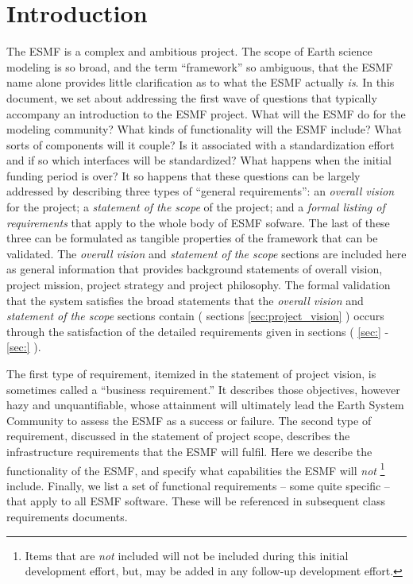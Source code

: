 \section{Introduction}
The ESMF is a complex and ambitious 
project.   The scope of Earth science modeling is so broad, and the 
term ``framework'' so ambiguous, that the ESMF name alone provides 
little clarification as to what the ESMF actually {\it is}.  In 
this document, we set about addressing the first wave of questions that 
typically accompany an introduction to the ESMF project.  What will the 
ESMF do for the modeling community?  What kinds of functionality will the ESMF 
include?  What sorts of components will it couple?  Is it associated with 
a standardization effort and if so which interfaces will be 
standardized?  What happens when the initial funding period is over?  
It so happens that these questions can be largely addressed by
describing three types of ``general requirements'': an {\it overall vision}
for the project; a {\it statement of the scope} of the project; and a {\it formal listing of requirements} that apply to the whole body of ESMF sofware.
The last of these three can be formulated as tangible properties of the 
framework that can be validated. The {\it overall vision} and {\it statement of 
the scope} sections are included here as general information that provides
background statements of overall vision, project mission, project strategy
and project philosophy. The formal validation that the system satisfies the
broad statements that the {\it overall vision} and {\it statement of the scope} 
sections contain ( sections \ref{sec:project_vision} ) occurs through the satisfaction
of the detailed requirements given in sections ( \ref{sec:} - \ref{sec:} ).


The first type of requirement, itemized in the statement of project
vision, is sometimes called a ``business requirement.'' \cite{wiegers}
It describes those objectives, however hazy and unquantifiable, whose
attainment will ultimately lead the Earth System Community to assess
the ESMF as a success or failure.  The second type of requirement,
discussed in the statement of project scope, describes the
infrastructure requirements that the ESMF will fulfil.  Here we
describe the functionality of the ESMF, and specify what capabilities
the ESMF will {\it not} 
\footnote{ Items that are {\it not}
included will not be included during this initial development
effort, but, may be added in any follow-up
development effort.}
include.
Finally, we list a set of functional
requirements -- some quite specific -- that apply to all ESMF
software.  These will be referenced in subsequent class requirements
documents. 





